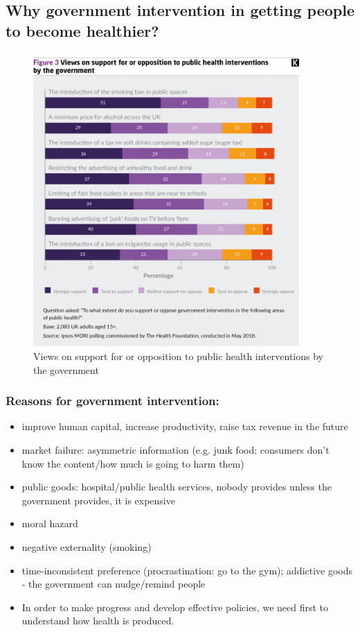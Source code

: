 \subsection{Why government intervention in getting people to become healthier?}
        \begin{figure}[H]%
                \centering
                \includegraphics[width=4in]{images/ch3/22.png}
                \caption{Views on support for or opposition to public health interventions by the government}
            \end{figure}

\subsubsection{Reasons for government intervention:}          
\begin{itemize}           
        \item improve human capital, increase productivity, raise tax revenue in the future
        \item market failure: asymmetric information (e.g. junk food: consumers don't know the content/how much is going to harm them)
        \item public goods: hospital/public health services, nobody provides unless the government provides, it is expensive
        \item moral hazard
        \item negative externality (smoking)
        \item time-inconsistent preference (procrastination: go to the gym); addictive goods - the government can nudge/remind people
        \item In order to make progress and develop effective policies, we need first to understand how health is produced.
\end{itemize} 

